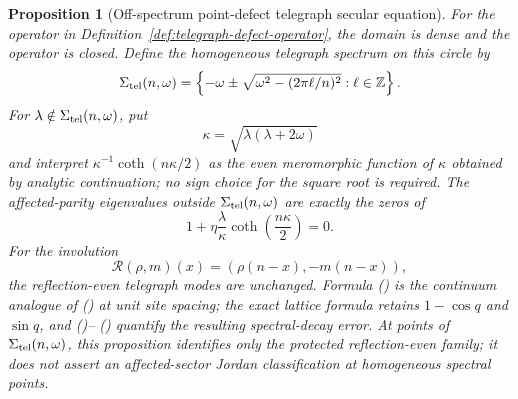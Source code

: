 \documentclass[twoside,10pt]{article}
\numberwithin{equation}{section}
\theoremstyle{slbody}
\newtheorem{proposition}[theorem]{Proposition}
\theoremstyle{definition}
\theoremstyle{remark}
\renewcommand{\eqref}[1]{%
  \textup{{\normalfont(\oldstylenums{\ref{#1}}}\normalfont)}}
\begin{document}
\begin{proposition}[Off-spectrum point-defect telegraph secular equation]
\label{prop:telegraph-defect}
For the operator in Definition~\ref{def:telegraph-defect-operator},
the domain is dense and the operator is closed.  Define the homogeneous
telegraph spectrum
on this circle by
\[
 \Sigma_{\rm tel}(n,\omega)
 =\left\{-\omega\pm
   \sqrt{\omega^2-(2\pi\ell/n)^2}:\ell\in\mathbb Z\right\}.
\]
For $\lambda\notin\Sigma_{\rm tel}(n,\omega)$, put
\[
 \kappa=\sqrt{\lambda(\lambda+2\omega)}
\]
and interpret
$\kappa^{-1}\coth(n\kappa/2)$ as the even meromorphic function of
$\kappa$ obtained by analytic continuation; no sign choice for the
square root is required.  The affected-parity eigenvalues outside
$\Sigma_{\rm tel}(n,\omega)$ are exactly the zeros of
\begin{equation}\label{eq:telegraph-defect}
 1+\eta\frac{\lambda}{\kappa}
            \coth\left(\frac{n\kappa}{2}\right)=0.
\end{equation}
For the involution
\[
 \mathcal R(\rho,m)(x)=(\rho(n-x),-m(n-x)),
\]
the reflection-even telegraph modes are unchanged.  Formula
\eqref{eq:telegraph-defect} is the
continuum analogue of \eqref{eq:resolvent-form} at unit site spacing;
the exact lattice formula retains $1-\cos q$ and $\sin q$, and
\eqref{eq:telegraph-error}--\eqref{eq:corrected-telegraph-error} quantify
the resulting spectral-decay error.
At points of $\Sigma_{\rm tel}(n,\omega)$, this proposition identifies
only the protected reflection-even family; it does not assert an
affected-sector Jordan classification at homogeneous spectral points.
\end{proposition}
\end{document}
